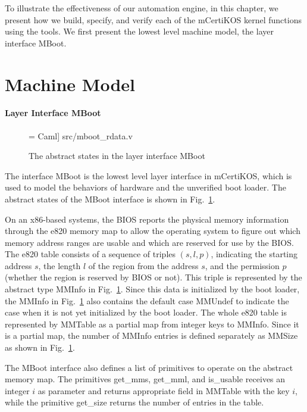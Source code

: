 To illustrate the effectiveness of our automation engine, in this chapter, we present
how we build, specify, and verify each of the mCertiKOS kernel functions using the tools.
We first present the lowest level machine model, the layer interface MBoot.

\section{Machine Model}
\paragraph{Layer Interface MBoot}

\begin{figure}
 = Caml] {src/mboot_rdata.v}
\caption{The abstract states in the layer interface MBoot}
\label{fig:ref:mboot_rdata}
\end{figure}

The interface MBoot is the lowest level layer interface in mCertiKOS, which is
used to model the behaviors of hardware and the unverified boot loader.
The abstract states of the MBoot interface is shown in Fig.~\ref{fig:ref:mboot_rdata}.

On an x86-based systems, the BIOS reports the physical memory information
through the \textsf{e820} memory map to allow the operating system to figure out
which memory address ranges are usable and which are reserved for use by the BIOS.
The \textsf{e820} table consists of a sequence of triples $(s, l, p)$, indicating
the starting address $s$, the length $l$ of the region from the address $s$, and
the permission $p$ (whether the region is reserved by BIOS or not). This triple
is represented by the abstract type \textsf{MMInfo} in Fig.~\ref{fig:ref:mboot_rdata}.
Since this data is initialized by the boot loader, the
\textsf{MMInfo} in Fig.~\ref{fig:ref:mboot_rdata} also contains the default case
\textsf{MMUndef} to indicate the case when it is not yet initialized by the boot loader.
The whole \textsf{e820} table is represented by \textsf{MMTable} as a partial map
from integer keys to \textsf{MMInfo}. Since it is a partial map, the number of
\textsf{MMInfo} entries is defined separately as \textsf{MMSize} as shown in
Fig.~\ref{fig:ref:mboot_rdata}.

The MBoot interface also defines a list of primitives to operate on the abstract
memory map. The primitives \textsf{get\_mms}, \textsf{get\_mml}, and \textsf{is\_usable}
receives an integer $i$ as parameter and returns appropriate field in \textsf{MMTable}
with the key $i$, while the primitive \textsf{get\_size} returns the number of
entries in the table.

